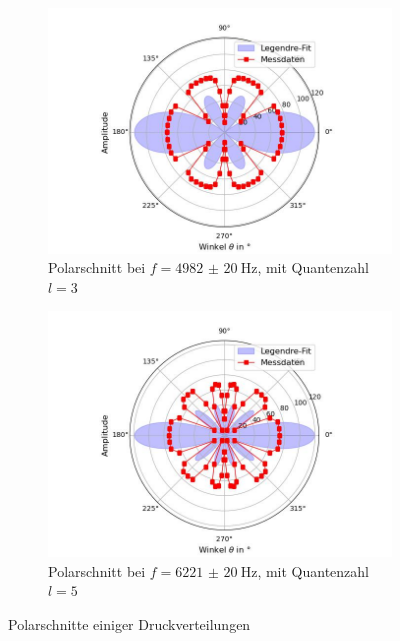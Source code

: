 \documentclass[../main.tex]{subfiles}
\begin{document}
\begin{figure}[H]
\begin{subfigure}[b]{0.45\textwidth}
                \label{fig:II_i_Polschnitt_3694_20}
            \end{subfigure}
            \begin{subfigure}[b]{0.45\textwidth}
                \centering
                \includegraphics[width=\textwidth]{Bilddateien/Auswertung/II_i_Polschnitt_4982_30.jpg}
                \caption{Polarschnitt bei $f=\SI{4982(20)}{\hertz}$, mit Quantenzahl $l=3$}
                \label{fig:II_i_Polschnitt_4982_30}
            \end{subfigure}
            \hfill
            \begin{subfigure}[b]{0.45\textwidth}
                \centering
                \includegraphics[width=\textwidth]{Bilddateien/Auswertung/II_i_Polschnitt_6221_50.jpg}
                \caption{Polarschnitt bei $f=\SI{6221(20)}{\hertz}$, mit Quantenzahl $l=5$}\label{fig:II_i_Polschnitt_6221_50}

            \end{subfigure}
            \caption{Polarschnitte einiger Druckverteilungen}
            \label{fig:II_i_Polschnitte}
    \end{figure}
\end{document}
